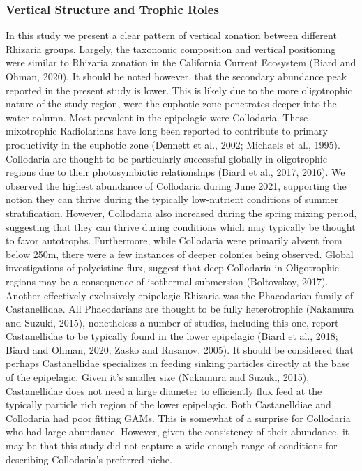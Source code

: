 \documentclass[
]{article}
\begin{document}
\hypertarget{vertical-structure-and-trophic-roles}{%
\subsubsection{Vertical Structure and Trophic
Roles}\label{vertical-structure-and-trophic-roles}}

In this study we present a clear pattern of vertical zonation between
different Rhizaria groups. Largely, the taxonomic composition and
vertical positioning were similar to Rhizaria zonation in the California
Current Ecosystem (Biard and Ohman, 2020). It should be noted however,
that the secondary abundance peak reported in the present study is
lower. This is likely due to the more oligotrophic nature of the study
region, were the euphotic zone penetrates deeper into the water column.
Most prevalent in the epipelagic were Collodaria. These mixotrophic
Radiolarians have long been reported to contribute to primary
productivity in the euphotic zone (Dennett et al., 2002; Michaels et
al., 1995). Collodaria are thought to be particularly successful
globally in oligotrophic regions due to their photosymbiotic
relationships (Biard et al., 2017, 2016). We observed the highest
abundance of Collodaria during June 2021, supporting the notion they can
thrive during the typically low-nutrient conditions of summer
stratification. However, Collodaria also increased during the spring
mixing period, suggesting that they can thrive during conditions which
may typically be thought to favor autotrophs. Furthermore, while
Collodaria were primarily absent from below 250m, there were a few
instances of deeper colonies being observed. Global investigations of
polycistine flux, suggest that deep-Collodaria in Oligotrophic regions
may be a consequence of isothermal submersion (Boltovskoy, 2017).
Another effectively exclusively epipelagic Rhizaria was the Phaeodarian
family of Castanellidae. All Phaeodarians are thought to be fully
heterotrophic (Nakamura and Suzuki, 2015), nonetheless a number of
studies, including this one, report Castanellidae to be typically found
in the lower epipelagic (Biard et al., 2018; Biard and Ohman, 2020;
Zasko and Rusanov, 2005). It should be considered that perhaps
Castanellidae specializes in feeding sinking particles directly at the
base of the epipelagic. Given it's smaller size (Nakamura and Suzuki,
2015), Castanellidae does not need a large diameter to efficiently flux
feed at the typically particle rich region of the lower epipelagic. Both
Castanelldiae and Collodaria had poor fitting GAMs. This is somewhat of
a surprise for Collodaria who had large abundance. However, given the
consistency of their abundance, it may be that this study did not
capture a wide enough range of conditions for describing Collodaria's
preferred niche.
\end{document}
